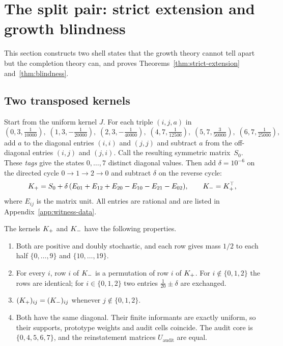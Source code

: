 \section{The split pair: strict extension and growth blindness}\label{sec:extension}

This section constructs two shell states that the growth theory cannot tell apart but the completion theory can, and proves Theorems~\ref{thm:strict-extension} and~\ref{thm:blindness}.

\subsection{Two transposed kernels}

Start from the uniform kernel $J$. For each triple $(i,j,a)$ in
\[
(0,3,\tfrac1{10000}),\;(1,3,-\tfrac1{20000}),\;(2,3,-\tfrac1{40000}),\;
(4,7,\tfrac1{12500}),\;(5,7,\tfrac3{50000}),\;(6,7,\tfrac1{25000}),
\]
add $a$ to the diagonal entries $(i,i)$ and $(j,j)$ and subtract $a$ from the off-diagonal entries $(i,j)$ and $(j,i)$. Call the resulting symmetric matrix~$S_0$. These \emph{tags} give the states $0,\dots,7$ distinct diagonal values. Then add $\delta=10^{-6}$ on the directed cycle $0\to1\to2\to0$ and subtract $\delta$ on the reverse cycle:
\[
K_{+}=S_0+\delta\,(E_{01}+E_{12}+E_{20}-E_{10}-E_{21}-E_{02}),\qquad K_{-}=K_{+}^{\top},
\]
where $E_{ij}$ is the matrix unit. All entries are rational and are listed in Appendix~\ref{app:witness-data}.

\begin{lemma}\label{lem:warm-kernels}
The kernels $K_{+}$ and $K_{-}$ have the following properties.
\begin{enumerate}
  \item Both are positive and doubly stochastic, and each row gives mass $1/2$ to each half $\{0,\dots,9\}$ and $\{10,\dots,19\}$.
  \item For every $i$, row $i$ of $K_{-}$ is a permutation of row $i$ of $K_{+}$. For $i\notin\{0,1,2\}$ the rows are identical; for $i\in\{0,1,2\}$ two entries $\tfrac1{20}\pm\delta$ are exchanged.
  \item $(K_{+})_{ij}=(K_{-})_{ij}$ whenever $j\notin\{0,1,2\}$.
  \item Both have the same diagonal. Their finite informants are exactly uniform, so their supports, prototype weights and audit cells coincide. The audit core is $\{0,4,5,6,7\}$, and the reinstatement matrices $U_{\mathrm{audit}}$ are equal.
\end{enumerate}
\end{lemma}

